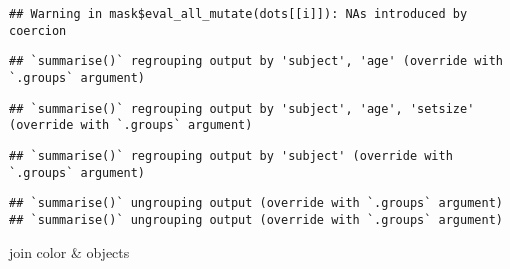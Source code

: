 \documentclass[
]{article}
\newenvironment{Shaded}{\begin{snugshade}}{\end{snugshade}}
\newcommand{\DataTypeTok}[1]{\textcolor[rgb]{0.13,0.29,0.53}{#1}}
\newcommand{\KeywordTok}[1]{\textcolor[rgb]{0.13,0.29,0.53}{\textbf{#1}}}
\newcommand{\NormalTok}[1]{#1}
\newcommand{\OperatorTok}[1]{\textcolor[rgb]{0.81,0.36,0.00}{\textbf{#1}}}
\newcommand{\StringTok}[1]{\textcolor[rgb]{0.31,0.60,0.02}{#1}}
\begin{document}
\begin{verbatim}
## Warning in mask$eval_all_mutate(dots[[i]]): NAs introduced by coercion
\end{verbatim}

\begin{verbatim}
## `summarise()` regrouping output by 'subject', 'age' (override with `.groups` argument)
\end{verbatim}

\begin{verbatim}
## `summarise()` regrouping output by 'subject', 'age', 'setsize' (override with `.groups` argument)
\end{verbatim}

\begin{verbatim}
## `summarise()` regrouping output by 'subject' (override with `.groups` argument)
\end{verbatim}

\begin{verbatim}
## `summarise()` ungrouping output (override with `.groups` argument)
## `summarise()` ungrouping output (override with `.groups` argument)
\end{verbatim}

join color \& objects

\begin{Shaded}
\end{Shaded}
\end{document}
